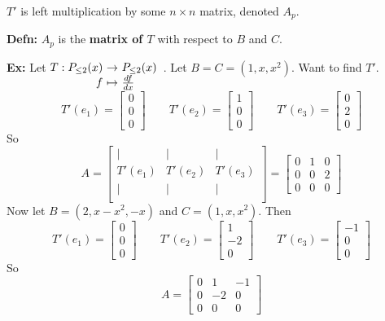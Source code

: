 \documentclass[10pt,letterpaper]{article}
\newcommand{\n}{\hfill\break}
\newcommand{\hangblock}[2]{\par\noindent\settowidth{\hangindent}{\textbf{#1: }}\textbf{#1: }\!\!\!#2}
\newcommand{\defn}[1]{\hangblock{Defn}{#1}}
\newcommand{\ex}[1]{\hangblock{Ex}{#1}}
\newcommand{\map}[4]{\!\!\!\begin{array}[t]{rcl}#1 & \!\!\!\!\to & \!\!\!\!#2\\ #3 & \!\!\!\!\mapsto & \!\!\!\!#4\end{array}}
\newcommand{\dd}[2]{\frac{d#1}{d#2}}
\begin{document}
\par\noindent
$T'$ is left multiplication by some $n\times{}n$ matrix, denoted $A_{p}$.\n

\defn{
	$A_{p}$ is the \textbf{matrix of $T$} with respect to $B$ and $C$.\n
}

\ex{
	Let $\map{T:P_{\le{}2}(x)}{P_{\le{}2}(x)}{f}{\dd{f}{x}}$. Let $B=C=(1,x,x^{2})$. Want to find $T'$.
	\[
		T'(e_{1})=\begin{bmatrix}0\\ 0\\ 0\end{bmatrix}\qquad{}T'(e_{2})=\begin{bmatrix}1\\ 0\\ 0\end{bmatrix}\qquad{}T'(e_{3})=\begin{bmatrix}0\\ 2\\ 0\end{bmatrix}
	\]
	So
	\[
		A=\begin{bmatrix}
			| & | & |\\
			T'(e_{1}) & T'(e_{2}) & T'(e_{3})\\
			| & | & |\\
		\end{bmatrix}=\begin{bmatrix}
			0 & 1 & 0\\
			0 & 0 & 2\\
			0 & 0 & 0
		\end{bmatrix}
	\]
	Now let $B=(2,x-x^{2},-x)$ and $C=(1,x,x^{2})$. Then
	\[
		T'(e_{1})=\begin{bmatrix}0\\ 0\\ 0\end{bmatrix}\qquad{}T'(e_{2})=\begin{bmatrix}1\\ -2\\ 0\end{bmatrix}\qquad{}T'(e_{3})=\begin{bmatrix}-1\\ 0\\ 0\end{bmatrix}
	\]
	So
	\[
		A=\begin{bmatrix}
			0 & 1 & -1\\
			0 & -2 & 0\\
			0 & 0 & 0
		\end{bmatrix}
	\]
}
\end{document}
